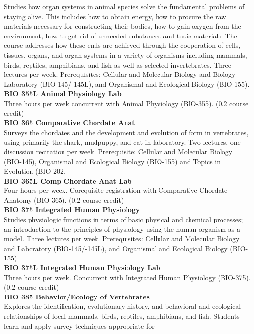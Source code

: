 \documentclass[
  letterpaper,
]{scrbook}
\begin{document}
Studies how organ systems in animal species solve the fundamental
problems of staying alive. This includes how to obtain energy, how to
procure the raw materials necessary for constructing their bodies, how
to gain oxygen from the environment, how to get rid of unneeded
substances and toxic materials. The course addresses how these ends are
achieved through the cooperation of cells, tissues, organs, and organ
systems in a variety of organisms including mammals, birds, reptiles,
amphibians, and fish as well as selected invertebrates. Three lectures
per week. Prerequisites: Cellular and Molecular Biology and Biology
Laboratory (BIO-145/-145L), and Organismal and Ecological Biology
(BIO-155).\\
\textbf{BIO 355L Animal Physiology Lab}\\
Three hours per week concurrent with Animal Physiology (BIO-355). (0.2
course credit)\\
\textbf{BIO 365 Comparative Chordate Anat}\\
Surveys the chordates and the development and evolution of form in
vertebrates, using primarily the shark, mudpuppy, and cat in laboratory.
Two lectures, one discussion recitation per week. Prerequisite: Cellular
and Molecular Biology (BIO-145), Organismal and Ecological Biology
(BIO-155) and Topics in Evolution (BIO-202.\\
\textbf{BIO 365L Comp Chordate Anat Lab}\\
Four hours per week. Corequisite registration with Comparative Chordate
Anatomy (BIO-365). (0.2 course credit)\\
\textbf{BIO 375 Integrated Human Physiology}\\
Studies physiologic functions in terms of basic physical and chemical
processes; an introduction to the principles of physiology using the
human organism as a model. Three lectures per week. Prerequisites:
Cellular and Molecular Biology and Laboratory (BIO-145/-145L), and
Organismal and Ecological Biology (BIO-155).\\
\textbf{BIO 375L Integrated Human Physiology Lab}\\
Three hours per week. Concurrent with Integrated Human Physiology
(BIO-375). (0.2 course credit)\\
\textbf{BIO 385 Behavior/Ecology of Vertebrates}\\
Explores the identification, evolutionary history, and behavioral and
ecological relationships of local mammals, birds, reptiles, amphibians,
and fish. Students learn and apply survey techniques appropriate for
\end{document}
